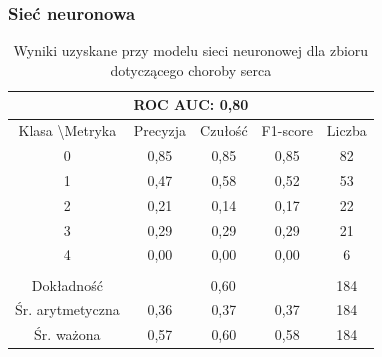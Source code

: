 \subsubsection{Sieć neuronowa}
\begin{table}[H]
\centering
    \caption{Wyniki uzyskane przy modelu sieci neuronowej dla zbioru dotyczącego choroby serca}
\begin{tabular}{|ccccc|}
\hline
\multicolumn{5}{|c|}{ROC AUC: 0,80}  \\ \hline
\multicolumn{1}{|c|}{Klasa \textbackslash Metryka} & \multicolumn{1}{c|}{Precyzja} & \multicolumn{1}{c|}{Czułość} & \multicolumn{1}{c|}{F1-score} & Liczba \\ \hline
\multicolumn{1}{|c|}{0}                            & \multicolumn{1}{c|}{0,85}     & \multicolumn{1}{c|}{0,85}    & \multicolumn{1}{c|}{0,85}     & 82    \\ \hline
\multicolumn{1}{|c|}{1}                            & \multicolumn{1}{c|}{0,47}     & \multicolumn{1}{c|}{0,58}    & \multicolumn{1}{c|}{0,52}     & 53    \\ \hline
\multicolumn{1}{|c|}{2}                            & \multicolumn{1}{c|}{0,21}     & \multicolumn{1}{c|}{0,14}    & \multicolumn{1}{c|}{0,17}     & 22    \\ \hline
\multicolumn{1}{|c|}{3}                            & \multicolumn{1}{c|}{0,29}     & \multicolumn{1}{c|}{0,29}    & \multicolumn{1}{c|}{0,29}     & 21    \\ \hline
\multicolumn{1}{|c|}{4}                            & \multicolumn{1}{c|}{0,00}     & \multicolumn{1}{c|}{0,00}    & \multicolumn{1}{c|}{0,00}     & 6     \\ \hline
\multicolumn{5}{|c|}{}  \\ \hline
\multicolumn{1}{|c|}{Dokładność}                   & \multicolumn{3}{c|}{0,60} & 184   \\ \hline
\multicolumn{1}{|c|}{Śr. arytmetyczna}                    & \multicolumn{1}{c|}{0,36}     & \multicolumn{1}{c|}{0,37}    & \multicolumn{1}{c|}{0,37}     & 184   \\ \hline
\multicolumn{1}{|c|}{Śr. ważona}                   & \multicolumn{1}{c|}{0,57}     & \multicolumn{1}{c|}{0,60}    & \multicolumn{1}{c|}{0,58}     & 184   \\ \hline
\end{tabular}
    \label{tab:heart_disease_dnn_metrics}
\end{table}

